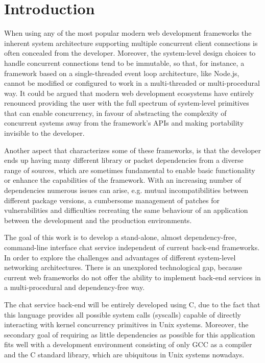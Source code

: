 \section{Introduction}
When using any of the most popular modern web development frameworks the inherent system architecture supporting multiple concurrent client connections is often concealed from the developer. Moreover, the system-level design choices to handle concurrent connections tend to be immutable, so that, for instance, a framework based on a single-threaded event loop architecture, like Node.js, cannot be modified or configured to work in a multi-threaded or multi-procedural way. It could be argued that modern web development ecosystems have entirely renounced providing the user with the full spectrum of system-level primitives that can enable concurrency, in favour of abstracting the complexity of concurrent systems away from the framework's APIs and making portability invisible to the developer.

Another aspect that characterizes some of these frameworks, is that the developer ends up having many different library or packet dependencies from a diverse range of sources, which are sometimes fundamental to enable basic functionality or enhance the capabilities of the framework. With an increasing number of dependencies numerous issues can arise, e.g. mutual incompatibilities between different package versions, a cumbersome management of patches for vulnerabilities and difficulties recreating the same behaviour of an application between the development and the production environments. 

The goal of this work is to develop a stand-alone, almost dependency-free, command-line interface chat service independent of current back-end frameworks. In order to explore the challenges and advantages of different system-level networking architectures. There is an unexplored technological gap, because current web frameworks do not offer the ability to implement back-end services in a multi-procedural and dependency-free way. 

The chat service back-end will be entirely developed using C, due to the fact that this language provides all possible system calls (syscalls) capable of directly interacting with kernel concurrency primitives in Unix systems. Moreover, the secondary goal of requiring as little dependencies as possible for this application fits well with a development environment consisting of only GCC as a compiler and the C standard library, which are ubiquitous in Unix systems nowadays. 

